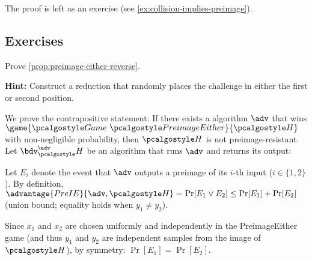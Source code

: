 The proof is left as an exercise (see \autoref{ex:collision-implies-preimage}).

\subsection{Exercises}

\begin{exercise}\label{ex:preimage-either-reverse}
  Prove \autoref{prop:preimage-either-reverse}.
  
  \textbf{Hint:} Construct a reduction that randomly places the challenge in either the first or second position.
\end{exercise}

\ifsolutions
\begin{mysolution}
  We prove the contrapositive statement:
  If there exists a \ppt algorithm $\adv$ that wins $\game{\Game~\algo{PreimageEither}}{\algo{H}}$ with non-negligible probability, then $\algo{H}$ is not preimage-resistant.
  Let $\bdv^\adv_\algo{H}$ be an algorithm that runs $\adv$ and returns its output:

  \begin{center}
    \begin{tcolorbox}[width=6cm]
      \begin{pchstack}[center]
      \end{pchstack}
    \end{tcolorbox}
  \end{center}
  
  Let $E_i$ denote the event that $\adv$ outputs a preimage of its $i$-th input ($i \in \{1, 2\}$).
  By definition, $\advantage{PreIE}{\adv, \algo{H}} = \Pr[E_1 \vee E_2] \leq \Pr[E_1] + \Pr[E_2]$ (union bound; equality holds when $y_1 \neq y_2$).
  
  Since $x_1$ and $x_2$ are chosen uniformly and independently in the PreimageEither game (and thus $y_1$ and $y_2$ are independent samples from the image of $\algo{H}$), by symmetry: $\Pr[E_1] = \Pr[E_2]$.
  

\end{mysolution}
